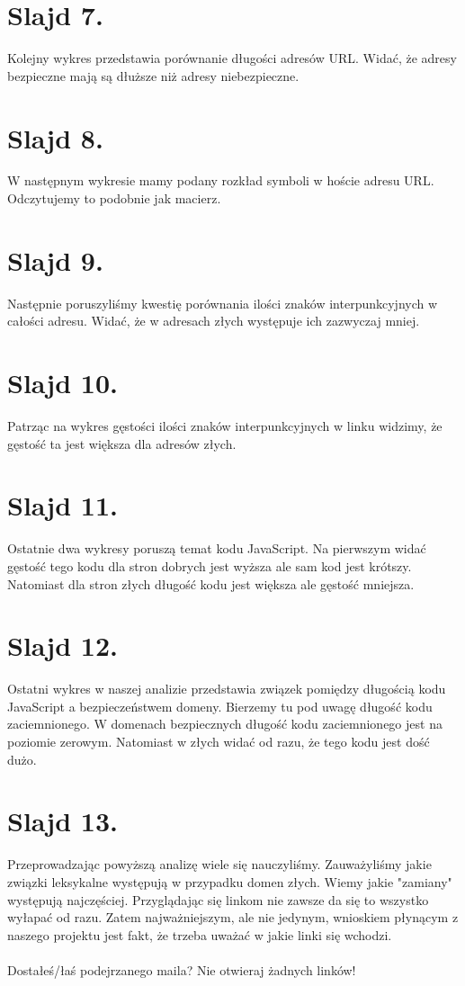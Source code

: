 \documentclass{article}
\begin{document}
\section{Slajd 7.}
{
	Kolejny wykres przedstawia porównanie długości adresów URL. Widać, że adresy bezpieczne mają są dłuższe niż adresy niebezpieczne.
}
\section{Slajd 8.}
{
	W następnym wykresie mamy podany rozkład symboli w hoście adresu URL. Odczytujemy to podobnie jak macierz.
}
\section{Slajd 9.}
{
	Następnie poruszyliśmy kwestię porównania ilości znaków interpunkcyjnych w całości adresu. Widać, że w adresach złych występuje ich zazwyczaj mniej.
}
\section{Slajd 10.}
{
	Patrząc na wykres gęstości ilości znaków interpunkcyjnych w linku widzimy, że gęstość ta jest większa dla adresów złych.
}
\section{Slajd 11.}
{
	Ostatnie dwa wykresy poruszą temat kodu JavaScript. Na pierwszym widać gęstość tego kodu dla stron dobrych jest wyższa ale sam kod jest krótszy. Natomiast dla stron złych długość kodu jest większa ale gęstość mniejsza. 
}
\section{Slajd 12.}
{
	Ostatni wykres w naszej analizie przedstawia związek pomiędzy długością kodu JavaScript a bezpieczeństwem domeny. Bierzemy tu pod uwagę długość kodu zaciemnionego. W domenach bezpiecznych długość kodu zaciemnionego jest na poziomie zerowym. Natomiast w złych widać od razu, że tego kodu jest dość dużo.
}
\section{Slajd 13.}
{
	Przeprowadzając powyższą analizę wiele się nauczyliśmy. Zauważyliśmy jakie związki leksykalne występują w przypadku domen złych. Wiemy jakie "zamiany" występują najczęściej. Przyglądając się linkom nie zawsze da się to wszystko wyłapać od razu. Zatem najważniejszym, ale nie jedynym, wnioskiem płynącym z naszego projektu jest fakt, że trzeba uważać w jakie linki się wchodzi.\\
	~\\
	Dostałeś/łaś podejrzanego maila? Nie otwieraj żadnych linków!
}
\end{document}
